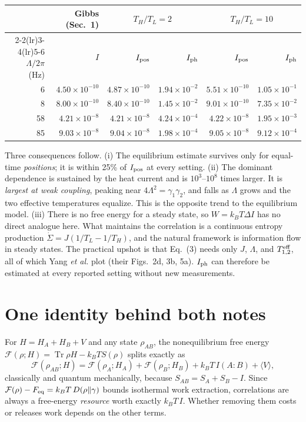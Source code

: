 \documentclass[9pt]{article}
\begin{document}
\begin{center}
\begin{tabular}{rrrrrr}
\toprule
& Gibbs (Sec.~1) & \multicolumn{2}{c}{$T_H/T_L=2$} & \multicolumn{2}{c}{$T_H/T_L=10$}\\
\cmidrule(lr){2-2}\cmidrule(lr){3-4}\cmidrule(lr){5-6}
$\Lambda/2\pi$ (Hz) & $I$ & $I_{\rm pos}$ & $I_{\rm ph}$ & $I_{\rm pos}$ & $I_{\rm ph}$\\
\midrule
6  & $4.50\times10^{-10}$ & $4.87\times10^{-10}$ & $1.94\times10^{-2}$ & $5.51\times10^{-10}$ & $1.05\times10^{-1}$\\
8  & $8.00\times10^{-10}$ & $8.40\times10^{-10}$ & $1.45\times10^{-2}$ & $9.01\times10^{-10}$ & $7.35\times10^{-2}$\\
58 & $4.21\times10^{-8}$  & $4.21\times10^{-8}$  & $4.24\times10^{-4}$ & $4.22\times10^{-8}$  & $1.95\times10^{-3}$\\
85 & $9.03\times10^{-8}$  & $9.04\times10^{-8}$  & $1.98\times10^{-4}$ & $9.05\times10^{-8}$  & $9.12\times10^{-4}$\\
\bottomrule
\end{tabular}
\end{center}
Three consequences follow.
(i) The equilibrium estimate survives only for equal-time \emph{positions}; it is within 25\% of $I_{\rm pos}$ at every setting.
(ii) The dominant dependence is sustained by the heat current and is $10^3$--$10^8$ times larger. It is \emph{largest at weak coupling}, peaking near $4\Lambda^2=\gamma_1\gamma_2$, and falls as $\Lambda$ grows and the two effective temperatures equalize. This is the opposite trend to the equilibrium model.
(iii) There is no free energy for a steady state, so $W=k_BT\Delta I$ has no direct analogue here. What maintains the correlation is a continuous entropy production $\dot\Sigma=J(1/T_L-1/T_H)$, and the natural framework is information flow in steady states.\cite{horowitz2014}
The practical upshot is that Eq.~(3) needs only $J$, $\Lambda$, and $T^{\rm eff}_{1,2}$, all of which Yang \emph{et al.} plot (their Figs.~2d, 3b, 5a). $I_{\rm ph}$ can therefore be estimated at every reported setting without new measurements.

\section{One identity behind both notes}
For $H=H_A+H_B+V$ and any state $\rho_{AB}$, the nonequilibrium free energy $\mathcal F(\rho;H)=\operatorname{Tr}\rho H-k_BTS(\rho)$ splits exactly as
\begin{equation}
 \mathcal F(\rho_{AB};H)=\mathcal F(\rho_A;H_A)+\mathcal F(\rho_B;H_B)+k_BT\,I(A\!:\!B)+\langle V\rangle,
\end{equation}
classically and quantum mechanically, because $S_{AB}=S_A+S_B-I$. Since $\mathcal F(\rho)-F_{\rm eq}=k_BT\,D(\rho\Vert\gamma)$ bounds isothermal work extraction,\cite{esposito2011} correlations are always a free-energy \emph{resource} worth exactly $k_BT\,I$.\cite{oppenheim2002,perarnau2015} Whether removing them costs or releases work depends on the other terms.
\end{document}
